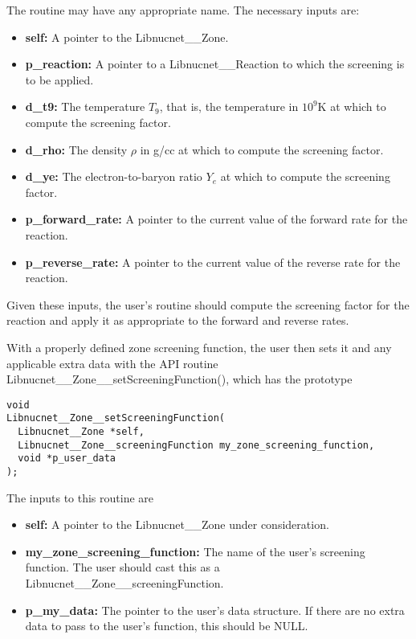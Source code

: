 \documentclass{article}    %
\begin{document}
The routine may have any appropriate name.  The necessary inputs are:

\begin{itemize}

\item {\bf self:}  A pointer to the Libnucnet\_\_Zone.

\item {\bf p\_reaction:}  A pointer to a Libnucnet\_\_Reaction to which
the screening is to be applied.

\item {\bf d\_t9:} The temperature $T_9$, that is, the temperature
in $10^9$K at which to compute the screening factor.

\item {\bf d\_rho:} The density $\rho$ in g/cc at which to compute the screening
factor.

\item {\bf d\_ye:} The electron-to-baryon ratio $Y_e$ at which to compute the
screening factor.

\item {\bf p\_forward\_rate:}  A pointer to the current value of the
forward rate for the reaction.

\item {\bf p\_reverse\_rate:}  A pointer to the current value of the
reverse rate for the reaction.

\end{itemize}

Given these inputs, the user's routine should compute the screening factor
for the reaction and apply it as appropriate to the forward and
reverse rates.

With a properly defined zone screening function, the user then
sets it and any applicable extra data with the API routine
Libnucnet\_\_Zone\_\_setScreeningFunction(), which has the prototype

\begin{verbatim}
void
Libnucnet__Zone__setScreeningFunction(
  Libnucnet__Zone *self,
  Libnucnet__Zone__screeningFunction my_zone_screening_function,
  void *p_user_data
);
\end{verbatim}

The inputs to this routine are
\begin{itemize}

\item {\bf self:}  A pointer to the Libnucnet\_\_Zone under consideration.

\item {\bf my\_zone\_screening\_function:}  The name of the user's screening
function.  The user should cast this as a
Libnucnet\_\_Zone\_\_screeningFunction.

\item {\bf p\_my\_data:}  The pointer to the user's data structure.  If there
are no extra data to pass to the user's function, this should be NULL.
\end{itemize}
\end{document}
